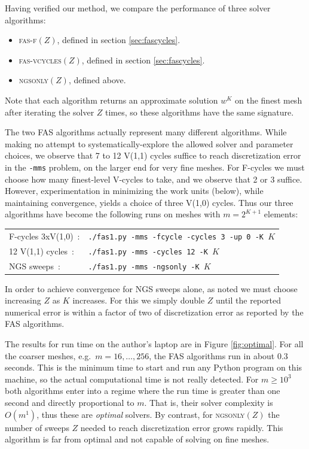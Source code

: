 \documentclass[letterpaper,final,12pt,reqno]{amsart}
\begin{document}
Having verified our method, we compare the performance of three solver algorithms:

\begin{itemize}
\item \textsc{fas-f}$(Z)$, defined in section \ref{sec:fascycles}.
\item \textsc{fas-vcycles}$(Z)$, defined in section \ref{sec:fascycles}.
\item \textsc{ngsonly}$(Z)$, defined above.
\end{itemize}

\noindent Note that each algorithm returns an approximate solution $w^K$ on the finest mesh after iterating the solver $Z$ times, so these algorithms have the same signature.

The two FAS algorithms actually represent many different algorithms.  While making no attempt to systematically-explore the allowed solver and parameter choices, we observe that 7 to 12 V(1,1) cycles suffice to reach discretization error in the \texttt{-mms} problem, on the larger end for very fine meshes.  For F-cycles we must choose how many finest-level V-cycles to take, and we observe that 2 or 3 suffice.  However, experimentation in minimizing the work units (below), while maintaining convergence, yields a choice of three V(1,0) cycles.  Thus our three algorithms have become the following runs on meshes with $m=2^{K+1}$ elements:

\medskip
\begin{tabular}{ll}
\textsf{F-cycles 3xV(1,0)} \,:        &\texttt{./fas1.py -mms -fcycle -cycles 3 -up 0 -K }$K$ \\
\textsf{12 V(1,1) cycles} \,:  &\texttt{./fas1.py -mms -cycles 12 -K }$K$ \\
\textsf{NGS sweeps} \,:      &\texttt{./fas1.py -mms -ngsonly -K }$K$
\end{tabular}

\medskip
In order to achieve convergence for NGS sweeps alone, as noted we must choose increasing $Z$ as $K$ increases.  For this we simply double $Z$ until the reported numerical error is within a factor of two of discretization error as reported by the FAS algorithms.

The results for run time on the author's laptop are in Figure \ref{fig:optimal}.  For all the coarser meshes, e.g.~$m=16,\dots,256$, the FAS algorithms run in about 0.3 seconds.  This is the minimum time to start and run any Python program on this machine, so the actual computational time is not really detected.  For $m \ge 10^3$ both algorithms enter into a regime where the run time is greater than one second and directly proportional to $m$.  That is, their solver complexity is $O(m^1)$, thus these are \emph{optimal} \cite[Chapter 7]{Bueler2021} solvers.  By contrast, for \textsc{ngsonly}$(Z)$ the number of sweeps $Z$ needed to reach discretization error grows rapidly.  This algorithm is far from optimal and not capable of solving on fine meshes.
\end{document}

